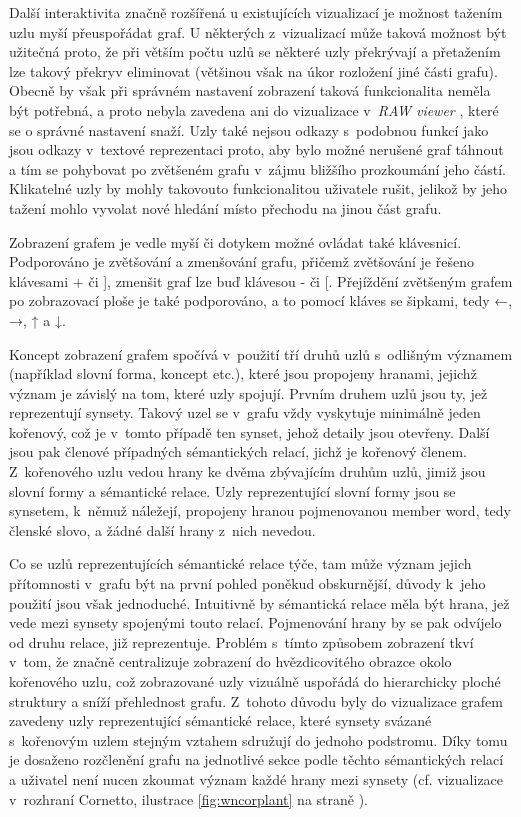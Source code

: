 \documentclass[a4paper, 11pt, oneside, showtrims]{book}
\newcommand{\simplywn}{\textit{RAW viewer} }
\newcommand\ex{\textsf}
\begin{document}
				Další interaktivita značně rozšířená u existujících vizualizací je možnost tažením uzlu myší přeuspořádat graf. U některých z~vizualizací může taková možnost být užitečná proto, že při větším počtu uzlů se některé uzly překrývají a přetažením lze takový překryv eliminovat (většinou však na úkor rozložení jiné části grafu). Obecně by však při správném nastavení zobrazení taková funkcionalita neměla být potřebná, a proto nebyla zavedena ani do vizualizace v~\simplywn, které se o správné nastavení snaží. Uzly také nejsou odkazy s~podobnou funkcí jako jsou odkazy v~textové reprezentaci proto, aby bylo možné nerušené graf táhnout a tím se pohybovat po zvětšeném grafu v~zájmu bližšího prozkoumání jeho částí. Klikatelné uzly by mohly takovouto funkcionalitou uživatele rušit, jelikož by jeho tažení mohlo vyvolat nové hledání místo přechodu na jinou část grafu.

				Zobrazení grafem je vedle myší či dotykem možné ovládat také klávesnicí. Podporováno je zvětšování a zmenšování grafu, přičemž zvětšování je řešeno klávesami \ex{+} či \ex{]}, zmenšit graf lze buď klávesou \ex{-} či \ex{[}. Přejíždění zvětšeným grafem po zobrazovací ploše je také podporováno, a to pomocí kláves se šipkami, tedy \ex{←}, {→}, {↑} a {↓}.


				Koncept zobrazení grafem spočívá v~použití tří druhů uzlů s~odlišným významem (například slovní forma, koncept etc.), které jsou propojeny hranami, jejichž význam je závislý na tom, které uzly spojují. Prvním druhem uzlů jsou ty, jež reprezentují synsety. Takový uzel se v~grafu vždy vyskytuje minimálně jeden kořenový, což je v~tomto případě ten synset, jehož detaily jsou otevřeny. Další jsou pak členové případných sémantických relací, jichž je kořenový členem. Z~kořenového uzlu vedou hrany ke dvěma zbývajícím druhům uzlů, jimiž jsou slovní formy a sémantické relace. Uzly reprezentující slovní formy jsou se synsetem, k~němuž náležejí, propojeny hranou pojmenovanou \ex{member word}, tedy členské slovo, a žádné další hrany z~nich nevedou. 

				Co se uzlů reprezentujících sémantické relace týče, tam může význam jejich přítomnosti v~grafu být na první pohled poněkud obskurnější, důvody k~jeho použití jsou však jednoduché. Intuitivně by sémantická relace měla být hrana, jež vede mezi synsety spojenými touto relací. Pojmenování hrany by se pak odvíjelo od druhu relace, již reprezentuje. Problém s~tímto způsobem zobrazení tkví v~tom, že značně centralizuje zobrazení do hvězdicovitého obrazce okolo kořenového uzlu, což zobrazované uzly vizuálně uspořádá do hierarchicky ploché struktury a sníží přehlednost grafu. Z~tohoto důvodu byly do vizualizace grafem zavedeny uzly reprezentující sémantické relace, které synsety svázané s~kořenovým uzlem stejným vztahem sdružují do jednoho podstromu. Díky tomu je dosaženo rozčlenění grafu na jednotlivé sekce podle těchto sémantických relací a uživatel není nucen zkoumat význam každé hrany mezi synsety (cf. vizualizace v~rozhraní Cornetto, ilustrace \ref{fig:wncorplant} na straně \pageref{fig:wncorplant}).
\end{document}

